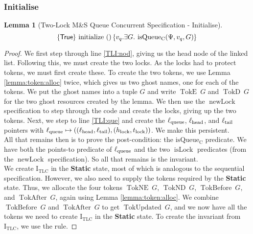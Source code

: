 \documentclass[a4paper, 10pt]{report}
\theoremstyle{definition}
\newtheorem{lemma}[theorem]{Lemma}
\newcommand{\isLock}{\operatorname{isLock}}
\newcommand{\newLock}{\operatorname{newLock}}
\newcommand{\initialise}{\operatorname{initialize}}
\newcommand{\msq}{M\&S Queue}
\newcommand{\tlmsq}{Two-Lock \msq{}}
\newcommand{\isqueueconc}{\operatorname{isQueue_{C}}}
\newcommand{\TLQueueInvariantConc}{\operatorname{I_{TLC}}}
\newcommand{\vq}{v_q}
\newcommand{\locN}[1]{\loc_{\mathrm{#1}}}
\newcommand{\lochead}{\locN{head}}
\newcommand{\loctail}{\locN{tail}}
\newcommand{\locqueue}{\locN{queue}}
\newcommand{\Hlock}{h_{\mathrm{lock}}}
\newcommand{\Tlock}{t_{\mathrm{lock}}}
\newcommand{\StaticState}{\textbf{Static}\xspace}
\newcommand{\Qg}{G}
\newcommand{\TokE}[1]{\operatorname{TokE} ~ #1}
\newcommand{\TokEQg}{\TokE{\Qg}}
\newcommand{\TokNE}[1]{\operatorname{TokNE} ~ #1}
\newcommand{\TokNEQg}{\TokNE{\Qg}}
\newcommand{\TokD}[1]{\operatorname{TokD} ~ #1}
\newcommand{\TokDQg}{\TokD{\Qg}}
\newcommand{\TokND}[1]{\operatorname{TokND} ~ #1}
\newcommand{\TokNDQg}{\TokND{\Qg}}
\newcommand{\TokBefore}[1]{\operatorname{TokBefore} ~ #1}
\newcommand{\TokBeforeQg}{\TokBefore{\Qg}}
\newcommand{\TokAfter}[1]{\operatorname{TokAfter} ~ #1}
\newcommand{\TokAfterQg}{\TokAfter{\Qg}}
\newcommand{\TokUpdated}[1]{\operatorname{TokUpdated} ~ #1}
\newcommand{\TokUpdatedQg}{\TokUpdated{\Qg}}
\newcommand{\concspecinitHTGen}[3]{\hoare{\TRUE}{\initialise \ \TT}{#2 . \Exists #3. \isqueueconc(#1, #2, #3)}}
\newcommand{\concspecinitGen}[3]{\concspecinitHTGen{#1}{#2}{#3}}
\newcommand{\concspecinit}[1]{\concspecinitGen{#1}{\vq}{\Qg}}
\begin{document}
\subsubsection{Initialise}
\begin{lemma}[\tlmsq{} Concurrent Specification - Initialise]\label{TLMSQ:spec:conc:init}
  \begin{equation*}
    \concspecinit{\Psi}
  \end{equation*}
\end{lemma}
\begin{proof}
We first step through line \ref{TLI:nod}, giving us the head node of the linked list. Following this, we must create the two locks. As the locks had to protect tokens, we must first create these. To create the two tokens, we use Lemma \ref{lemma:token:alloc} twice, which gives us two ghost names, one for each of the tokens. We put the ghost names into a tuple $\Qg$ and write $\TokEQg$ and $\TokDQg$ for the two ghost resources created by the lemma. We then use the $\newLock$ specification to step through the code and create the locks, giving up the two tokens. Next, we step to line \ref{TLI:que} and create the $\locqueue$, $\lochead$, and $\loctail$ pointers with $\locqueue \mapsto ((\lochead, \loctail), (\Hlock, \Tlock))$. We make this persistent.\\
All that remains then is to prove the post-condition: the $\isqueueconc$ predicate. We have both the points-to predicate of $\locqueue$ and the two $\isLock$ predicates (from the $\newLock$ specification). So all that remains is the invariant.\\
We create $\TLQueueInvariantConc$ in the \StaticState state, most of which is analogous to the sequential specification. However, we also need to supply the tokens required by the \StaticState state. Thus, we allocate the four tokens $\TokNEQg$, $\TokNDQg$, $\TokBeforeQg$, and $\TokAfterQg$, again using Lemma \ref{lemma:token:alloc}. We combine $\TokBeforeQg$ and $\TokAfterQg$ to get $\TokUpdatedQg$, and we now have all the tokens we need to create $\TLQueueInvariantConc$ in the \StaticState state. To create the invariant from $\TLQueueInvariantConc$, we use the  rule.
\end{proof}
\end{document}
